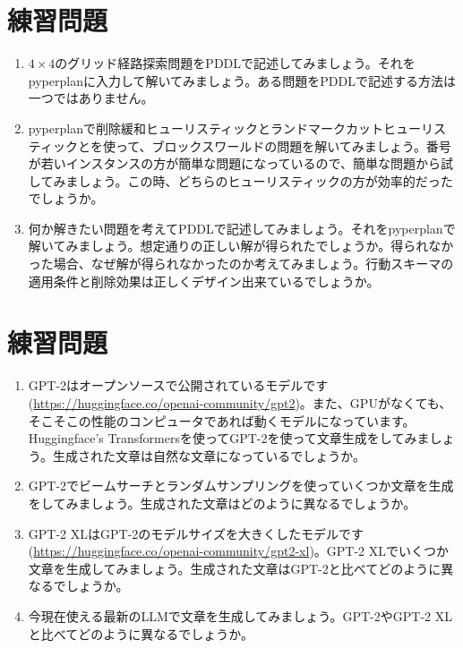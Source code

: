 \section{練習問題}
\begin{enumerate}
	\item $4 \times 4$のグリッド経路探索問題をPDDLで記述してみましょう。それをpyperplanに入力して解いてみましょう。ある問題をPDDLで記述する方法は一つではありません。
	
	\item pyperplanで削除緩和ヒューリスティックとランドマークカットヒューリスティックとを使って、ブロックスワールドの問題を解いてみましょう。番号が若いインスタンスの方が簡単な問題になっているので、簡単な問題から試してみましょう。この時、どちらのヒューリスティックの方が効率的だったでしょうか。
	
	\item 何か解きたい問題を考えてPDDLで記述してみましょう。それをpyperplanで解いてみましょう。想定通りの正しい解が得られたでしょうか。得られなかった場合、なぜ解が得られなかったのか考えてみましょう。行動スキーマの適用条件と削除効果は正しくデザイン出来ているでしょうか。
\end{enumerate}


\section{練習問題}
\begin{enumerate}
	\item GPT-2はオープンソースで公開されているモデルです (\url{https://huggingface.co/openai-community/gpt2})。また、GPUがなくても、そこそこの性能のコンピュータであれば動くモデルになっています。Huggingface's Transformersを使ってGPT-2を使って文章生成をしてみましょう。生成された文章は自然な文章になっているでしょうか。
	
    \item GPT-2でビームサーチとランダムサンプリングを使っていくつか文章を生成をしてみましょう。生成された文章はどのように異なるでしょうか。
    
    \item GPT-2 XLはGPT-2のモデルサイズを大きくしたモデルです (\url{https://huggingface.co/openai-community/gpt2-xl})。GPT-2 XLでいくつか文章を生成してみましょう。生成された文章はGPT-2と比べてどのように異なるでしょうか。
    
    \item 今現在使える最新のLLMで文章を生成してみましょう。GPT-2やGPT-2 XLと比べてどのように異なるでしょうか。
\end{enumerate}
